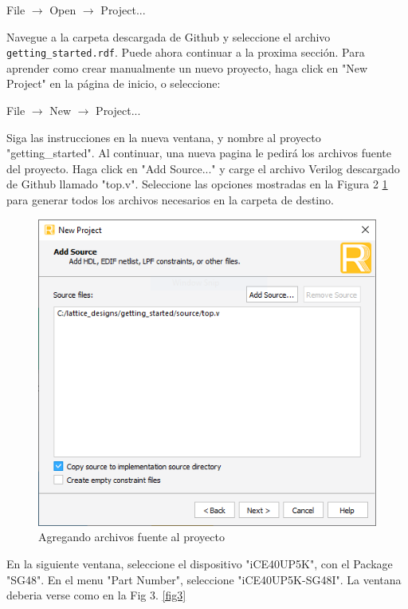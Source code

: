 \documentclass[11pt, a4paper, oneside]{article}
\begin{document}
\begin{center}
	File $\rightarrow$ Open $\rightarrow$ Project...
\end{center}
Navegue a la carpeta descargada de Github y seleccione el archivo \texttt{getting\_started.rdf}. Puede ahora continuar a la proxima sección. Para aprender como crear manualmente un nuevo proyecto, haga click en "New Project" en la página de inicio, o seleccione:
\begin{center}
	File $\rightarrow$ New $\rightarrow$ Project...
\end{center}
Siga las instrucciones en la nueva ventana, y nombre al proyecto "getting\_started". Al continuar, una nueva pagina le pedirá los archivos fuente del proyecto. Haga click en "Add Source..." y carge el archivo Verilog descargado de Github llamado "top.v". Seleccione las opciones mostradas en la Figura 2 \ref{fig2} para generar todos los archivos necesarios en la carpeta de destino.
%
\begin{figure}[h!]
	\centering
	\includegraphics[scale=0.8]{figs/fig2.png}
	\caption{Agregando archivos fuente al proyecto}
	\label{fig2}
\end{figure}

En la siguiente ventana, seleccione el dispositivo "iCE40UP5K", con el Package "SG48". En el menu "Part Number", seleccione "iCE40UP5K-SG48I". La ventana deberia verse como en la Fig 3. \ref{fig3}
\end{document}
